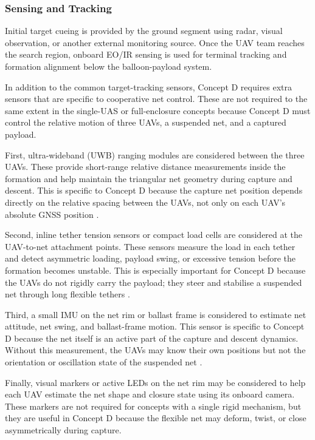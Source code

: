 \subsubsection{Sensing and Tracking}

Initial target cueing is provided by the ground segment using radar, visual observation, or another external monitoring source. Once the UAV team reaches the search region, onboard EO/IR sensing is used for terminal tracking and formation alignment below the balloon-payload system.

                                                                                   

In addition to the common target-tracking sensors, Concept D requires extra sensors that are specific to cooperative net control. These are not required to the same extent in the single-UAS or full-enclosure concepts because Concept D must control the relative motion of three UAVs, a suspended net, and a captured payload.

First, ultra-wideband (UWB) ranging modules are considered between the three UAVs. These provide short-range relative distance measurements inside the formation and help maintain the triangular net geometry during capture and descent. This is specific to Concept D because the capture net position depends directly on the relative spacing between the UAVs, not only on each UAV's absolute GNSS position \cite{Shule2020UWB-BasedSurvey}.

Second, inline tether tension sensors or compact load cells are considered at the UAV-to-net attachment points. These sensors measure the load in each tether and detect asymmetric loading, payload swing, or excessive tension before the formation becomes unstable. This is especially important for Concept D because the UAVs do not rigidly carry the payload; they steer and stabilise a suspended net through long flexible tethers \cite{Prkacin2025TrajectorySystems}.
 
Third, a small IMU on the net rim or ballast frame is considered to estimate net attitude, net swing, and ballast-frame motion. This sensor is specific to Concept D because the net itself is an active part of the capture and descent dynamics. Without this measurement, the UAVs may know their own positions but not the orientation or oscillation state of the suspended net \cite{Sun2025AgileLoad,EstevezSanz2024ReviewQuadrotors}.

Finally, visual markers or active LEDs on the net rim may be considered to help each UAV estimate the net shape and closure state using its onboard camera. These markers are not required for concepts with a single rigid mechanism, but they are useful in Concept D because the flexible net may deform, twist, or close asymmetrically during capture.





